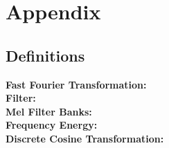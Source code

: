 \documentclass[11pt]{article}
\begin{document}
\section{Appendix}
\subsection{Definitions}
\textbf{Fast Fourier Transformation:}\label{fft}\\

\textbf{Filter:}\label{filter}\\

\textbf{Mel Filter Banks:}\label{mfb}\\

\textbf{Frequency Energy:}\label{freq-energy}\\

\textbf{Discrete Cosine Transformation:}\label{dct}
\end{document}
